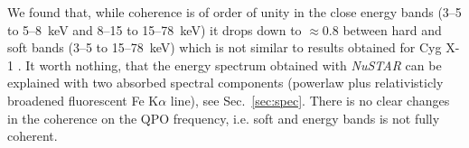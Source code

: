 \documentclass[a4paper,fleqn,usenatbib]{mnras}
\begin{document}
\begin{table}
We found that, while coherence is of order of unity in the close energy bands (3--5 to 5--8~keV and 8--15 to 15--78~keV) it drops down to $\approx0.8$ between hard and soft bands (3--5 to 15--78~keV) which is not similar to results obtained for Cyg X-1 \citep{nowak99}.
It worth nothing, that the energy spectrum obtained with {\it NuSTAR} can be explained with two absorbed spectral components (powerlaw plus relativisticly broadened fluorescent Fe K$\alpha$ line), see Sec.~\ref{sec:spec}.
There is no clear changes in the coherence on the QPO frequency, i.e. soft and energy bands is not fully coherent. %







\end{table}
\end{document}
